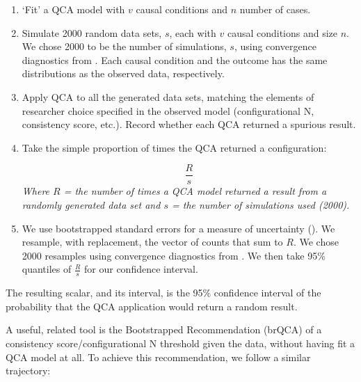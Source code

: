 \documentclass[12pt]{article}
\begin{document}
{{{{\begin{enumerate}
  \item `Fit' a QCA model with $v$ causal conditions and $n$ number of cases. 
  \item Simulate 2000 random data sets, $s$, each with $v$ causal conditions and size $n$. We chose 2000 to be the number of simulations, $s$, using convergence diagnostics from \cite{gelman_and_rubin_1992}. Each causal condition and the outcome has the same distributions as the observed data, respectively. 
  \item Apply QCA to all the generated data sets, matching the elements of researcher choice specified in the observed model (configurational N, consistency score, etc.). Record whether each QCA returned a spurious result.  
  \item Take the simple proportion of times the QCA returned a configuration: 
  \begin{center}
  \[
  \frac{R}{s} 
  \]
  {\it{Where $R$ = the number of times a QCA model returned a result from a randomly generated data set and $s$ = the number of simulations used (2000)}.}
  \end{center}
  \item We use bootstrapped standard errors for a measure of uncertainty (\citealt{efron_and_tibshirani_1994}). We resample, with replacement, the vector of counts that sum to $R$. We chose 2000 resamples using convergence diagnostics from \citet{gelman_and_rubin_1992}. We then take 95\% quantiles of  $\frac{R}{s}$ for our confidence interval.
\end{enumerate}


The resulting scalar, and its interval, is the 95\% confidence interval of the probability that the QCA application would return a random result. 

A useful, related tool is the Bootstrapped Recommendation (brQCA) of a consistency score/configurational N threshold given the data, without having fit a QCA model at all. To achieve this recommendation, we follow a similar trajectory: 

}}}}
\end{document}
